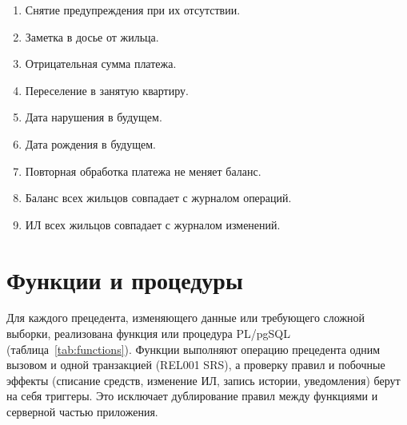 \documentclass[12pt,a4paper]{article}
\begin{document}
\begin{enumerate}[label=\arabic*., itemsep=0pt]
  \item Снятие предупреждения при их отсутствии.
  \item Заметка в досье от жильца.
  \item Отрицательная сумма платежа.
  \item Переселение в занятую квартиру.
  \item Дата нарушения в будущем.
  \item Дата рождения в будущем.
  \item Повторная обработка платежа не меняет баланс.
  \item Баланс всех жильцов совпадает с журналом операций.
  \item ИЛ всех жильцов совпадает с журналом изменений.
\end{enumerate}

\section{Функции и процедуры}\label{sec:functions}

Для каждого прецедента, изменяющего данные или требующего сложной выборки, реализована
функция или процедура PL/pgSQL (таблица~\ref{tab:functions}). Функции выполняют операцию прецедента
одним вызовом и одной транзакцией (REL001 SRS), а проверку правил и побочные эффекты (списание
средств, изменение ИЛ, запись истории, уведомления) берут на себя триггеры. Это исключает
дублирование правил между функциями и серверной частью приложения.
\end{document}
